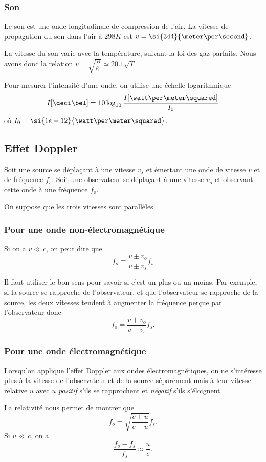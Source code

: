 \subsubsection{Son}
Le son est une onde longitudinale de compression de l'air.
La vitesse de propagation du son dans l'air à $298K$ est
$v = \si{344}{\meter\per\second}$.

La vitesse du son varie avec la température, suivant la loi des gaz parfaits.
Nous avons donc la relation $v = \sqrt{\frac{B}{\rho_0}} \simeq 20.1\sqrt{T}$

Pour mesurer l'intensité d'une onde, on utilise une échelle logarithmique
\[ I[\deci\bel] = 10 \log_{10}\frac{I[\watt\per\meter\squared]}{I_0} \]
où $I_0 = \si{1e-12}{\watt\per\meter\squared}$.

\subsection{Effet Doppler}
Soit une source se déplaçant à une vitesse $v_s$ et émettant
une onde de vitesse $v$ et de fréquence $f_s$.
Soit une observateur se déplaçant à une vitesse $v_o$ et
observant cette onde à une fréquence $f_o$.

On suppose que les trois vitesses sont parallèles.

\subsubsection{Pour une onde non-électromagnétique}
Si on a $v \ll c$, on peut dire que
\[ f_o = \frac{v \pm v_o}{v \pm v_s} f_s \]

Il faut utiliser le bon sens pour savoir si c'est un plus ou un moins.
Par exemple, si la source se rapproche de l'observateur, et que
l'observateur se rapproche de la source, les deux vitesses
tendent à augmenter la fréquence perçue par l'observateur donc
\[ f_o = \frac{v + v_o}{v - v_s} f_s. \]

\subsubsection{Pour une onde électromagnétique}
Lorsqu'on applique l'effet Doppler aux ondes électromagnétiques,
on ne s'intéresse plus à la vitesse de l'observateur et de la source séparément
mais à leur vitesse relative $u$ avec $u$ \emph{positif} s'ils se rapprochent
et \emph{négatif} s'ils s'éloignent.

La relativité nous permet de montrer que
\[ f_o = \sqrt{\frac{c + u}{c - u}}f_s. \]
Si $u \ll c$, on a
\[ \frac{f_o - f_s}{f_s} \approx \frac{u}{c}. \]

